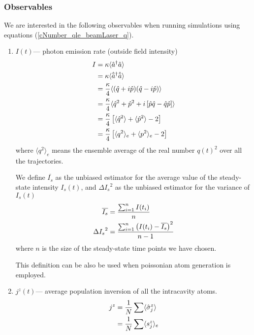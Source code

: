 \documentclass{article}
\begin{document}
\subsubsection{Observables}
We are interested in the following observables when running simulations using equations (\ref{cNumber_qle_beamLaser_q}).
\begin{enumerate}
    \item  $I(t)$\---- photon emission rate (outside field intensity)
        \begin{align}
        \label{intensity_cNumberCavity}
            \notag I &= \kappa \langle \hat{a}^\dagger \hat{a} \rangle\\
            \notag   &= \kappa \langle \hat{\tilde{a}}^\dagger \hat{\Tilde{a}} \rangle\\
            \notag   &= \frac{\kappa}{4} \langle ( \hat{q}+i\hat{p})(\hat{q}-i\hat{p}) \rangle\\
            \notag   &= \frac{\kappa}{4} \langle \hat{q}^2+\hat{p}^2+i\left[\hat{p}\hat{q}-\hat{q}\hat{p}\right] \rangle\\
            \notag   &= \frac{\kappa}{4}\left[\langle \hat{q}^2\rangle+\langle\hat{p}^2\rangle-2\right]\\
                     &= \frac{\kappa}{4}\left[\langle q^2 \rangle_e+\langle p^2 \rangle_e-2\right]
        \end{align}
        where $\langle q^2 \rangle_e$ means the ensemble average of the real number $q(t)^2$ over all the trajectories.
    
    We define $\overline{I_s}$ as the unbiased estimator for the average value of the steady-state intensity $I_s(t)$, and ${\Delta I_s}^2$ as the unbiased estimator for the variance of $I_s(t)$
    \begin{align}
    \label{estimator;intensity}
        \notag \overline{I_s} &= \frac{\sum_{i=1}^{n} I(t_i)}{n}\\
               {\Delta I_s}^2 &= \frac{\sum_{i=1}^{n} \left(I(t_i)-\overline{I_s}\right)^2}{n-1}
    \end{align}
    where $n$ is the size of the steady-state time points we have chosen.
    
    This definition can be also be used when poissonian atom generation is employed.
    \item $j^z(t)$\---- average population inversion of all the intracavity atoms.
        \begin{align}
            \notag j^z &= \frac{1}{N}\sum \langle \hat{\sigma}^z _j\rangle\\
                       &= \frac{1}{N}\sum \langle s_j^z\rangle_e
        \end{align}
        

\end{enumerate}
\end{document}
